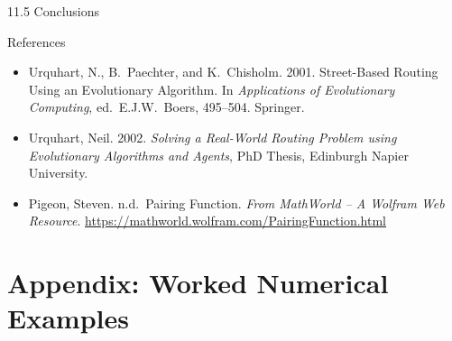\documentclass[aspectratio=169,10pt]{beamer}
\begin{document}
\begin{frame}[allowframebreaks]{11.5 Conclusions}
  \begin{block}{References}
    \begin{footnotesize}
    \begin{itemize}
      \item Urquhart, N., B.\ Paechter, and K.\ Chisholm. 2001.
            Street-Based Routing Using an Evolutionary Algorithm.
            In \emph{Applications of Evolutionary Computing}, ed.\ E.J.W.\ Boers,
            495--504. Springer.
      \item Urquhart, Neil. 2002.
            \emph{Solving a Real-World Routing Problem using Evolutionary
            Algorithms and Agents}, PhD Thesis, Edinburgh Napier University.
      \item Pigeon, Steven. n.d.\ Pairing Function. \emph{From MathWorld -- A
            Wolfram Web Resource}.
            \url{https://mathworld.wolfram.com/PairingFunction.html}
    \end{itemize}
    \end{footnotesize}
  \end{block}

\end{frame}


\appendix
\section{Appendix: Worked Numerical Examples}
\end{document}
